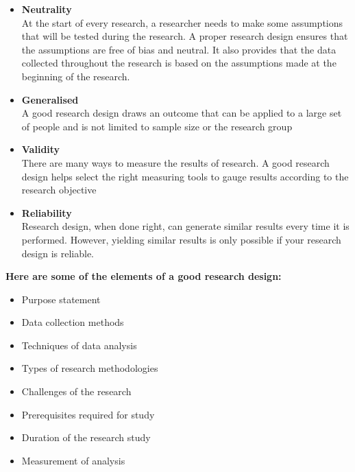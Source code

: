 \documentclass[conference]{IEEEtran}
\begin{document}
\begin{itemize}
	
	\item \textbf{Neutrality} \\
	At the start of every research, a researcher needs to make some assumptions that will be tested during the research.
	A proper research design ensures that the assumptions are free of bias and neutral. It also provides that the data collected throughout the research is based on the assumptions made at the beginning of the research.\\
	\item \textbf{Generalised}\\
	A good research design draws an outcome that can be applied to a large set of people and is not limited to sample size or the research group\\
	\item \textbf{Validity}\\
	There are many ways to measure the results of research. A good research design helps select the right measuring tools to gauge results according to the research objective\\
		\item \textbf{Reliability}\\
Research design, when done right, can generate similar results every time it is performed. However, yielding similar results is only possible if your research design is reliable.\\
	
\end{itemize}
 \textbf{Here are some of the elements of a good research design:}
 \begin{itemize}
 	
 	\item Purpose statement \\

 	\item Data collection methods \\

 	\item Techniques of data analysis\\
 
 	\item Types of research methodologies \\
 	\item Challenges of the research \\
 	\item Prerequisites required for study \\
 	\item Duration of the research study \\
 	\item Measurement of analysis \\
 	
 
 	
 \end{itemize}
 
\end{document}
